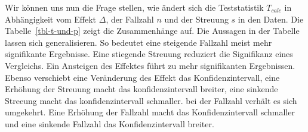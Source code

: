 \documentclass[
  letterpaper,
]{scrbook}
\begin{document}
Wir können uns nun die Frage stellen, wie ändert sich die Teststatistik
\(T_{calc}\) in Abhängigkeit vom Effekt \(\Delta\), der Fallzahl \(n\)
und der Streuung \(s\) in den Daten. Die Tabelle~\ref{tbl-t-und-p} zeigt
die Zusammenhänge auf. Die Aussagen in der Tabelle lassen sich
generalisieren. So bedeutet eine steigende Fallzahl meist mehr
signifikante Ergebnisse. Eine stiegende Streuung reduziert die
Signifikanz eines Vergleichs. Ein Ansteigen des Effektes führt zu mehr
signifikanten Ergebnissen. Ebenso verschiebt eine Veränderung des Effekt
das Konfidenzintervall, eine Erhöhung der Streuung macht das
konfidenzintervall breiter, eine sinkende Streeung macht das
konfidenzintervall schmaller. bei der Fallzahl verhält es sich
umgekehrt. Eine Erhöhung der Fallzahl macht das Konfidenzintervall
schmaller und eine sinkende Fallzahl das Konfidenzintervall breiter.
\end{document}
